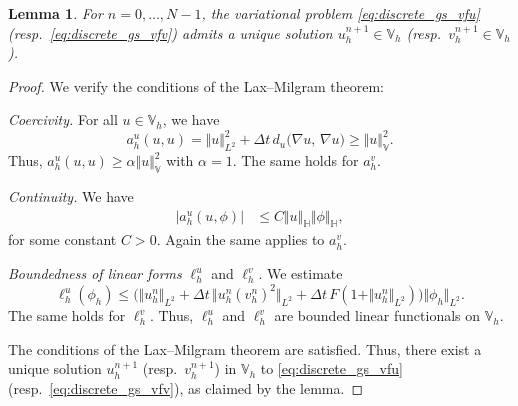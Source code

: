 \documentclass[11pt, a4paper]{amsart}
\newcommand{\HH}{\mathbb{H}}
\newcommand{\VV}{\mathbb{V}}
\newtheorem{lemma}[theorem]{Lemma}%
\numberwithin{equation}{section}
\begin{document}
	\begin{lemma}\label{lem:discrete_gs_unique_solution}
		For $n = 0,\ldots,N-1$, the variational problem \eqref{eq:discrete_gs_vfu}  (resp.\ \eqref{eq:discrete_gs_vfv}) admits a unique solution $u_h^{n+1}\in \VV_h$ (resp.\ $v_h^{n+1}\in \VV_h$).
	\end{lemma}
	\begin{proof}
		We verify the conditions of the Lax--Milgram theorem:
		
		\textit{Coercivity.} For all $u\in \VV_h$, we have
		\begin{equation*}
			a_h^u(u,u)=  \Vert u\Vert_{L^2}^2 + \Delta t\, d_u\big(\nabla u,\, \nabla u\big)\geq  \Vert u\Vert_{\VV}^2.
		\end{equation*}
		Thus, $a_h^u(u,u) \geq \alpha\Vert u\Vert_{\VV}^2$ with $\alpha = 1 $. The same holds for $a_h^v$.
		
		\medskip 
		
		\textit{Continuity.} We have
		\begin{align*}
			\vert a_h^u(u, \phi)\vert & \leq C \Vert u \Vert_{\HH} \Vert \phi \Vert_{\HH},
		\end{align*}
		for some constant $C>0$. Again the same applies to $a_h^v$.
		
		\medskip
		
		\textit{Boundedness of linear forms} $\ell_h^u$ and $\ell_h^v$. We estimate
		\begin{equation*}
			\ell_h^u(\phi_h)\leq \Big( \Vert u_h^n\Vert_{L^2} + \Delta t\, \Vert u_h^n(v_h^n)^2 \Vert_{L^2}  + \Delta t\, F(1 +\Vert u_h^n\Vert_{L^2})\Big) \Vert \phi_h\Vert_{L^2}.
		\end{equation*}
		The same holds for $\ell_h^v$.
		Thus, $\ell_h^u$ and $\ell_h^v$ are bounded linear functionals on $\VV_h$.
		
		\medskip
		
		The conditions of the Lax--Milgram theorem are satisfied. Thus, there exist a unique solution $u_h^{n+1}$ (resp.\ $v_h^{n+1}$) in $\VV_h$ to \eqref{eq:discrete_gs_vfu} (resp.\ \eqref{eq:discrete_gs_vfv}), as claimed by the lemma.
	\end{proof}
	
\end{document}
